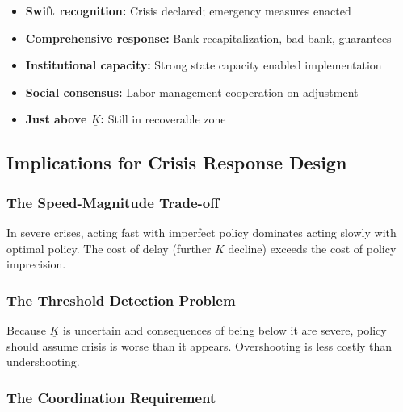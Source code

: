 \begin{itemize}
    \item \textbf{Swift recognition:} Crisis declared; emergency measures enacted
    \item \textbf{Comprehensive response:} Bank recapitalization, bad bank, guarantees
    \item \textbf{Institutional capacity:} Strong state capacity enabled implementation
    \item \textbf{Social consensus:} Labor-management cooperation on adjustment
    \item \textbf{Just above $\underline{K}$:} Still in recoverable zone
\end{itemize}

\subsection{Implications for Crisis Response Design}

\subsubsection{The Speed-Magnitude Trade-off}

\begin{tcolorbox}[colback=yellow!5!white, colframe=yellow!75!black, title=Policy Principle 1: Speed Over Perfection]
In severe crises, acting fast with imperfect policy dominates acting slowly 
with optimal policy. The cost of delay (further $K$ decline) exceeds the 
cost of policy imprecision.
\end{tcolorbox}

\subsubsection{The Threshold Detection Problem}

\begin{tcolorbox}[colback=yellow!5!white, colframe=yellow!75!black, title=Policy Principle 2: Assume Worst Case]
Because $\underline{K}$ is uncertain and consequences of being below it 
are severe, policy should assume crisis is worse than it appears. 
Overshooting is less costly than undershooting.
\end{tcolorbox}

\subsubsection{The Coordination Requirement}

